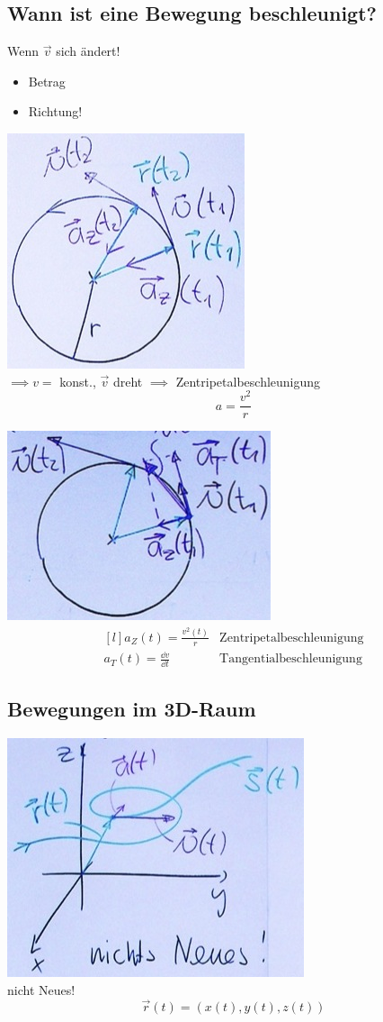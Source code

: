 \subsection{Wann ist eine Bewegung beschleunigt?}
Wenn $\vec{v}$ sich ändert!
\begin{itemize}[label = $\rightarrow$]
	\item Betrag
	\item Richtung!
\end{itemize}
\begin{bsp*}[note = Kreisbewegung mit konstante Umlaufgeschwindigkeit]
	\includegraphics{Bild16}\\
	$\implies v =$ konst., $\vec{v}$ dreht $\implies$ Zentripetalbeschleunigung
	\[ a = \frac{v^2}{r} \]
\end{bsp*}
\begin{bsp*}[note = beliebige Kreisbewegung ($v \neq$ konst.)]
	\includegraphics{Bild17} \\
	\[ \begin{matrix*}[l]
		a_Z(t) = \frac{v^2(t)}{r}		&\text{Zentripetalbeschleunigung} \\
		a_T(t) = \frac{\dd v}{\dd t}	&\text{Tangentialbeschleunigung}
	\end{matrix*} \]
\end{bsp*}

\subsection{Bewegungen im 3D-Raum}
\includegraphics{Bild18} \\
nicht Neues!
\[ \vec{r}(t) = ( x(t) , y(t) , z(t) ) \]

